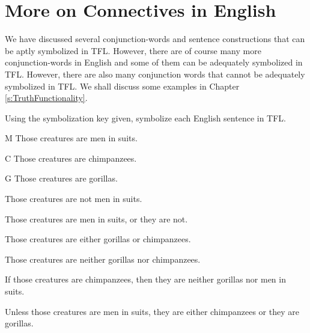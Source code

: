 \section{More on Connectives in English}
We have discussed several conjunction-words and sentence constructions that can be aptly symbolized in TFL. However, there are of course many more conjunction-words in English and some of them can be adequately symbolized in TFL. However, there are also many conjunction words that cannot be adequately symbolized in TFL. We shall discuss some examples in Chapter \ref{s:TruthFunctionality}.



\begin{practiceproblems}
\problempart Using the symbolization key given, symbolize each English sentence in TFL.\label{pr.monkeysuits}
	\begin{ekey}
		\item[M] Those creatures are men in suits.
		\item[C] Those creatures are chimpanzees.
		\item[G] Those creatures are gorillas.
	\end{ekey}
\begin{earg}
\item Those creatures are not men in suits.
\item Those creatures are men in suits, or they are not.
\item Those creatures are either gorillas or chimpanzees.
\item Those creatures are neither gorillas nor chimpanzees.
\item If those creatures are chimpanzees, then they are neither gorillas nor men in suits.
\item Unless those creatures are men in suits, they are either chimpanzees or they are gorillas.
\end{earg}


\end{practiceproblems}
